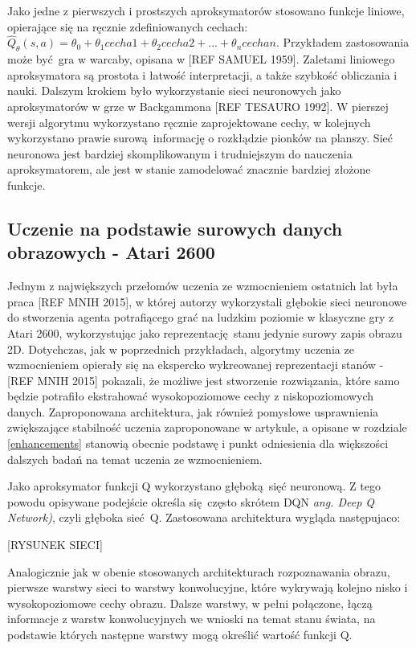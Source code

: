 Jako jedne z pierwszych i prostszych aproksymatorów stosowano funkcje liniowe, opierające się na ręcznie zdefiniowanych cechach: $\hat{Q}_{\theta}(s,a) = \theta_0 + \theta_1cecha1 + \theta_2cecha2 + ... + \theta_ncechan$. Przykładem zastosowania może być gra w warcaby, opisana w [REF SAMUEL 1959]. Zaletami liniowego aproksymatora są prostota i łatwość interpretacji, a także szybkość obliczania i nauki. 
Dalszym krokiem było wykorzystanie sieci neuronowych jako aproksymatorów w grze w Backgammona [REF TESAURO 1992]. W pierszej wersji algorytmu wykorzystano ręcznie zaprojektowane cechy, w kolejnych wykorzystano prawie surową informację o rozkłądzie pionków na planszy. Sieć neuronowa jest bardziej skomplikowanym i trudniejszym do nauczenia aproksymatorem, ale jest w stanie zamodelować znacznie bardziej złożone funkcje.

\subsection{Uczenie na podstawie surowych danych obrazowych - Atari 2600}

Jednym z największych przełomów uczenia ze wzmocnieniem ostatnich lat była praca [REF MNIH 2015], w której autorzy wykorzystali głębokie sieci neuronowe do stworzenia agenta potrafiącego grać na ludzkim poziomie w klasyczne gry z Atari 2600, wykorzystując jako reprezentację stanu jedynie surowy zapis obrazu 2D. Dotychczas, jak w poprzednich przykładach, algorytmy uczenia ze wzmocnieniem opierały się na ekspercko wykreowanej reprezentacji stanów - [REF MNIH 2015] pokazali, że możliwe jest stworzenie rozwiązania, które samo będzie potrafiło ekstrahować wysokopoziomowe cechy z niskopoziomowych danych. Zaproponowana architektura, jak również pomysłowe usprawnienia zwiększające stabilność uczenia zaproponowane w artykule, a opisane w rozdziale \ref {enhancements} stanowią obecnie podstawę i punkt odniesienia dla większości dalszych badań na temat uczenia ze wzmocnieniem.

Jako aproksymator funkcji Q wykorzystano głęboką sięć neuronową. Z tego powodu opisywane podejście określa się często skrótem DQN \textit{ang. Deep Q Network)}, czyli głęboka sieć Q. Zastosowana architektura wygląda następujaco:

[RYSUNEK SIECI]

Analogicznie jak w obenie stosowanych architekturach rozpoznawania obrazu, pierwsze warstwy sieci to warstwy konwolucyjne, które wykrywają kolejno nisko i wysokopoziomowe cechy obrazu. Dalsze warstwy, w pełni połączone, łączą informacje z warstw konwolucyjnych we wnioski na temat stanu świata, na podstawie których następne warstwy mogą określić wartość funkcji Q.


